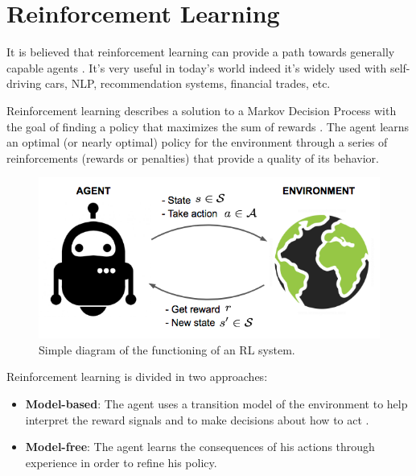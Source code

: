 \section{Reinforcement Learning}
\label{sec:rl}
It is believed that reinforcement learning can provide a path towards generally capable agents \cite{silver2021reward} \cite{parker2022automated}.
It's very useful in today's world indeed it's widely used with self-driving cars, NLP, recommendation systems, financial trades, etc.

Reinforcement learning \cite{sutton2018reinforcement} describes a solution to a Markov Decision Process
with the goal of finding a policy that maximizes the sum of rewards \cite{huys2014reward}.
%
The agent learns an optimal (or nearly optimal) policy for the environment \cite{russell2002artificial}
through a series of reinforcements (rewards or penalties) that provide a quality of its behavior.

\begin{figure}[ht]
    \centering
    \includegraphics[scale=0.4]{images/RL_illustration.png}
    \caption{Simple diagram of the functioning of an RL system.}
    \label{fig:RL_illustration}
\end{figure}

\noindent
Reinforcement learning is divided in two approaches:
\begin{itemize}
    \item \textbf{Model-based}:
          The agent uses a transition model of the environment to help interpret the reward signals and to make decisions about how to act \cite{russell2021artificial}.
    \item \textbf{Model-free}:
          The agent learns the consequences of his actions through experience in order to refine his policy.
\end{itemize}

